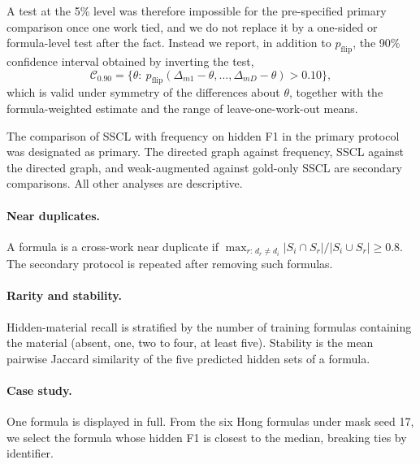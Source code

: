 \documentclass[10pt,a4paper]{article}
\makeatletter
\renewcommand{\subsection}{\@startsection{subsection}{2}{0pt}{9pt plus 2pt}{4pt}{\normalfont\normalsize\itshape}}
\makeatother
\begin{document}
A test at the 5\% level was therefore impossible for the pre-specified primary comparison once one work tied, and we do not replace it by a one-sided or formula-level test after the fact. Instead we report, in addition to $p_{\mathrm{flip}}$, the 90\% confidence interval obtained by inverting the test,
\begin{equation}
\mathcal C_{0.90}=\bigl\{\theta:\ p_{\mathrm{flip}}(\Delta_{m1}-\theta,\dots,\Delta_{mD}-\theta)>0.10\bigr\},
\label{eq:ci}
\end{equation}
which is valid under symmetry of the differences about $\theta$, together with the formula-weighted estimate and the range of leave-one-work-out means.

The comparison of SSCL with frequency on hidden F1 in the primary protocol was designated as primary. The directed graph against frequency, SSCL against the directed graph, and weak-augmented against gold-only SSCL are secondary comparisons. All other analyses are descriptive.

\subsection{Diagnostics}
\label{sec:diagnostics}

\paragraph{Near duplicates.} A formula is a cross-work near duplicate if $\max_{r:\,d_r\ne d_i}|S_i\cap S_r|/|S_i\cup S_r|\ge0.8$. The secondary protocol is repeated after removing such formulas.

\paragraph{Rarity and stability.} Hidden-material recall is stratified by the number of training formulas containing the material (absent, one, two to four, at least five). Stability is the mean pairwise Jaccard similarity of the five predicted hidden sets of a formula.

\paragraph{Case study.} One formula is displayed in full. From the six Hong formulas under mask seed 17, we select the formula whose hidden F1 is closest to the median, breaking ties by identifier.
\end{document}
